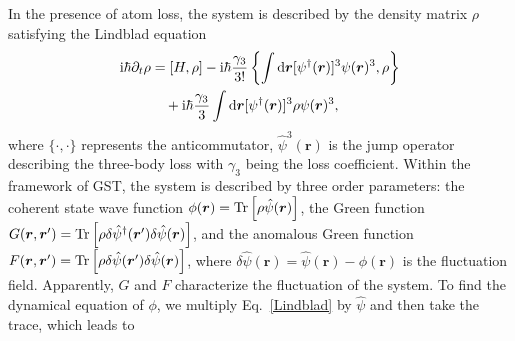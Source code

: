 \documentclass[pra,twocolumn,preprintnumbers,superscriptaddress,longbibliography,showkeys]{revtex4-1}
\begin{document}
In the presence of atom loss, the system is described by the density matrix $\rho$ satisfying the Lindblad equation
\begin{align}
{\rm i} \hbar \partial_{t} \rho &= \left[H, \rho \right] - {\rm i} \hbar \frac{\gamma_{3}}{3!} \left\{ \int {\rm d}{\bm r}[\psi^{\dagger}({\bm r})]^3 \psi({\bm r})^3, \rho \right\} \nonumber\\
&\quad + {\rm i} \hbar \frac{\gamma_{3}}{3} \int {\rm d}{\bm r}[\psi^{\dagger}({\bm r})]^3 \rho \psi({\bm r})^3 \label{Lindblad},
\end{align}
where $\{\cdot,\cdot\}$ represents the anticommutator, $\hat{\psi}^{3}({\bm r})$ is the jump operator describing the three-body loss with $\gamma_{3}$ being the loss coefficient. Within the framework of GST, the system is described by three order parameters: the coherent state wave function $\phi({\bm r}) = {\rm Tr}\left[\rho \hat{\psi}({\bm r})\right]$, the Green function $G({\bm r}, {\bm r}') = {\rm Tr}\left[ \rho \delta \hat{\psi}^{\dagger}({\bm r}^{\prime}) \delta \hat{\psi}({\bm r}) \right]$, and the anomalous Green function $F({\bm r}, {\bm r}') = {\rm Tr}\left[ \rho \delta \hat{\psi}({\bm r}^{\prime}) \delta \hat{\psi}({\bm r}) \right]$, where $\delta \hat{\psi}({\bm r})=\hat{\psi}({\bm r})-\phi({\bm r})$ is the fluctuation field. Apparently, $G$ and $F$ characterize the fluctuation of the system. To find the dynamical equation of $\phi$, we multiply Eq.~\eqref{Lindblad} by $\hat{\psi}$ and then take the trace, which leads to
\end{document}
